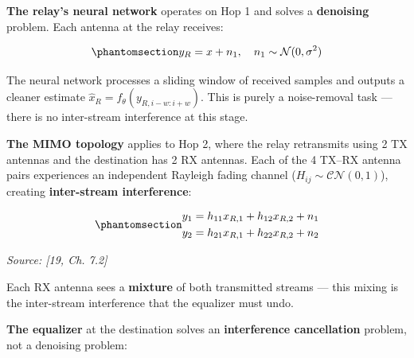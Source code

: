 \textbf{The relay's neural network} operates on Hop 1 and solves a \textbf{denoising} problem. Each antenna at the relay receives:

\begin{equation}\protect\phantomsection\label{eq:relay-received-siso}{y_R = x + n_1, \quad n_1 \sim \mathcal{N}(0, \sigma^2)
}\end{equation}

The neural network processes a sliding window of received samples and outputs a cleaner estimate \(\hat{x}_R = f_\theta(y_{R,i-w:i+w})\). This is purely a noise-removal task --- there is no inter-stream interference at this stage.

\textbf{The MIMO topology} applies to Hop 2, where the relay retransmits using 2 TX antennas and the destination has 2 RX antennas. Each of the 4 TX--RX antenna pairs experiences an independent Rayleigh fading channel (\(H_{ij} \sim \mathcal{CN}(0,1)\)), creating \textbf{inter-stream interference}:

\begin{equation}\protect\phantomsection\label{eq:mimo-interference}{\begin{aligned}
y_1 &= h_{11} x_{R,1} + h_{12} x_{R,2} + n_1 \\
y_2 &= h_{21} x_{R,1} + h_{22} x_{R,2} + n_2
\end{aligned}
}\end{equation} \par{\small\textit{Source: [19, Ch. 7.2]}}

Each RX antenna sees a \textbf{mixture} of both transmitted streams --- this mixing is the inter-stream interference that the equalizer must undo.

\textbf{The equalizer} at the destination solves an \textbf{interference cancellation} problem, not a denoising problem:


